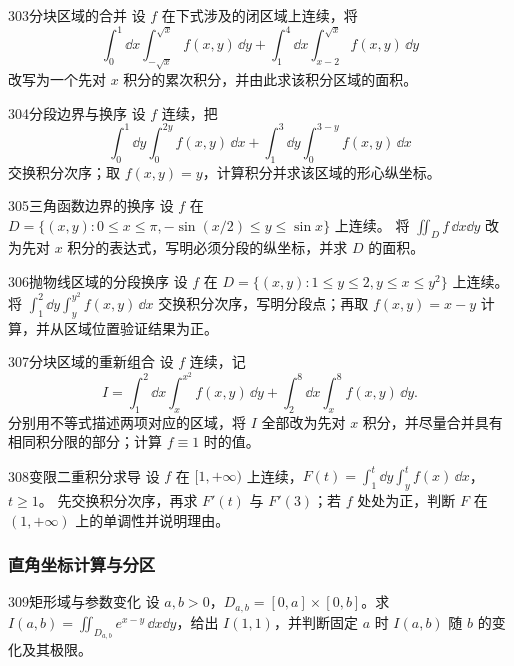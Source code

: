 \begin{exercise}{303}{分块区域的合并}
设 $f$ 在下式涉及的闭区域上连续，将
\[
 \int_0^1\dd x\int_{-\sqrt{x}}^{\sqrt{x}}f(x,y)\,\dd y
 +\int_1^4\dd x\int_{x-2}^{\sqrt{x}}f(x,y)\,\dd y
\]
改写为一个先对 $x$ 积分的累次积分，并由此求该积分区域的面积。
\end{exercise}

\begin{exercise}{304}{分段边界与换序}
设 $f$ 连续，把
\[
 \int_0^1\dd y\int_0^{2y}f(x,y)\,\dd x
 +\int_1^3\dd y\int_0^{3-y}f(x,y)\,\dd x
\]
交换积分次序；取 $f(x,y)=y$，计算积分并求该区域的形心纵坐标。
\end{exercise}

\begin{exercise}{305}{三角函数边界的换序}
设 $f$ 在 $D=\{(x,y):0\leq x\leq\pi,-\sin(x/2)\leq y\leq\sin x\}$ 上连续。
将 $\iint_Df\,\dd x\dd y$ 改为先对 $x$ 积分的表达式，写明必须分段的纵坐标，并求 $D$ 的面积。
\end{exercise}

\begin{exercise}{306}{抛物线区域的分段换序}
设 $f$ 在 $D=\{(x,y):1\leq y\leq2,y\leq x\leq y^2\}$ 上连续。
将 $\int_1^2\dd y\int_y^{y^2}f(x,y)\,\dd x$ 交换积分次序，写明分段点；再取 $f(x,y)=x-y$ 计算，并从区域位置验证结果为正。
\end{exercise}

\begin{exercise}{307}{分块区域的重新组合}
设 $f$ 连续，记
\[
 I=\int_1^2\dd x\int_x^{x^2}f(x,y)\,\dd y
 +\int_2^8\dd x\int_x^8f(x,y)\,\dd y.
\]
分别用不等式描述两项对应的区域，将 $I$ 全部改为先对 $x$ 积分，并尽量合并具有相同积分限的部分；计算 $f\equiv1$ 时的值。
\end{exercise}

\begin{exercise}{308}{变限二重积分求导}
设 $f$ 在 $[1,+\infty)$ 上连续，$F(t)=\int_1^t\dd y\int_y^t f(x)\,\dd x$，$t\geq1$。
先交换积分次序，再求 $F'(t)$ 与 $F'(3)$；若 $f$ 处处为正，判断 $F$ 在 $(1,+\infty)$ 上的单调性并说明理由。
\end{exercise}

\subsubsection{直角坐标计算与分区}

\begin{exercise}{309}{矩形域与参数变化}
设 $a,b>0$，$D_{a,b}=[0,a]\times[0,b]$。求 $I(a,b)=\iint_{D_{a,b}}e^{x-y}\,\dd x\dd y$，给出 $I(1,1)$，并判断固定 $a$ 时 $I(a,b)$ 随 $b$ 的变化及其极限。
\end{exercise}

